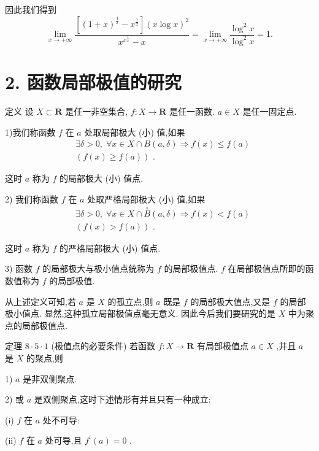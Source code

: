 因此我们得到
$$\mathop{\lim }\limits_{{x \rightarrow   + \infty }}\frac{\left\lbrack  {{\left( 1 + x\right) }^{\frac{1}{x}} - {x}^{\frac{1}{x}}}\right\rbrack  {\left( x\log x\right) }^{2}}{{x}^{{x}^{\frac{1}{x}}} - x} = \mathop{\lim }\limits_{{x \rightarrow   + \infty }}\frac{{\log }^{2}x}{{\log }^{2}x} = 1.$$

\section*{2. 函数局部极值的研究}

定义 设 $X \subset  \mathbf{R}$ 是任一非空集合, $f : X \rightarrow  \mathbf{R}$ 是任一函数. $a \in  X$ 是任一固定点.

1)我们称函数 $f$ 在 $a$ 处取局部极大 (小) 值,如果
\begin{align*}
	&\exists \delta  > 0,\;\forall x \in  X \cap  B\left( {a,\delta }\right)  \Rightarrow  f\left( x\right)  \leq  f\left( a\right)\\
	&\left( {f\left( x\right)  \geq  f\left( a\right) }\right) \text{ . }
\end{align*}

这时 $a$ 称为 $f$ 的局部极大 (小) 值点.

2) 我们称函数 $f$ 在 $a$ 处取严格局部极大 (小) 值,如果
\begin{align*}
	&\exists \delta  > 0,\;\forall x \in  X \cap  \overset{ \circ  }{B}\left( {a,\delta }\right)  \Rightarrow  f\left( x\right)  < f\left( a\right)\\
	&\left( {f\left( x\right)  > f\left( a\right) }\right) \text{ . }
\end{align*}

这时 $a$ 称为 $f$ 的严格局部极大 (小) 值点.

3) 函数 $f$ 的局部极大与极小值点统称为 $f$ 的局部极值点. $f$ 在局部极值点所即的函数值称为 $f$ 的局部极值.

从上述定义可知,若 $a$ 是 $X$ 的孤立点,则 $a$ 既是 $f$ 的局部极大值点,又是 $f$ 的局部极小值点. 显然,这种孤立局部极值点毫无意义. 因此今后我们要研究的是 $X$ 中为聚点的局部极值点.

定理 $8 \cdot  5 \cdot  1$ (极值点的必要条件) 若函数 $f : X \rightarrow  \mathbf{R}$ 有局部极值点 $a \in  X$ ,并且 $a$ 是 $X$ 的聚点,则

1) $a$ 是非双侧聚点.

2) 或 $a$ 是双侧聚点,这时下述情形有并且只有一种成立:

(i) $f$ 在 $a$ 处不可导:

(ii) $f$ 在 $a$ 处可导,且 ${f}^{\prime }\left( a\right)  = 0$ .

